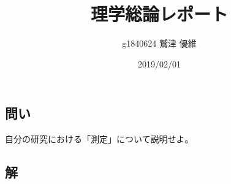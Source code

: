 \documentclass[10pt]{ujarticle}
\title{理学総論レポート}
\author{g1840624 鷲津 優維}
\date{2019/02/01}
\begin{document}
\maketitle
\section{}
\subsection{問い}
自分の研究における「測定」について説明せよ。

\subsection{解}
\end{document}
